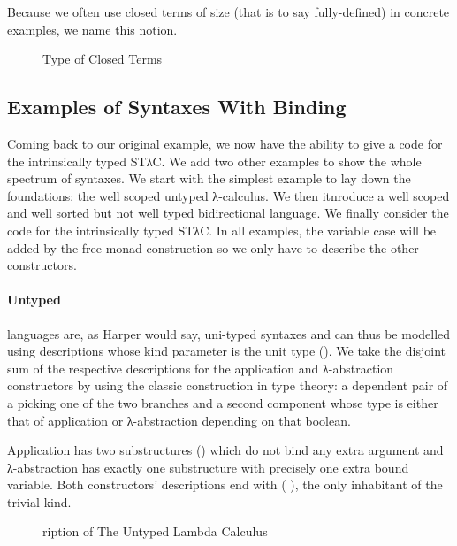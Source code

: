 Because we often use closed terms of size  (that is to say fully-defined)
in concrete examples, we name this notion.

\begin{figure}[h]
\caption{Type of Closed Terms\label{fig:closedtm}}
\end{figure}

\subsection{Examples of Syntaxes With Binding}

Coming back to our original example, we now have the ability to give a
code for the intrinsically typed STλC. We add two other examples to show
the whole spectrum of syntaxes.
%
We start with the simplest example to lay down the foundations: the well
scoped untyped λ-calculus.
%
We then itnroduce a well scoped and well sorted but not well typed
bidirectional language.
%
We finally consider the code for the intrinsically typed STλC.
%
In all examples, the variable case will be added by the free monad
construction so we only have to describe the other constructors.

\paragraph{Untyped} languages are, as Harper would say, uni-typed syntaxes and
can thus be modelled using descriptions whose kind parameter is the unit type
().
%
We take the disjoint sum of the respective descriptions for the application and
λ-abstraction constructors by using the classic construction in type theory: a
dependent pair of a  picking one of the two branches and a second
component whose type is either that of application or λ-abstraction depending
on that boolean.

Application has two substructures () which do not bind any extra
argument and λ-abstraction has exactly one substructure with precisely
one extra bound variable. Both constructors' descriptions end with
( ), the only inhabitant of the trivial kind.

\begin{figure}[h]
\caption{ription of The Untyped Lambda Calculus\label{fig:desculc}\label{fig:descUTLC}}
\end{figure}

